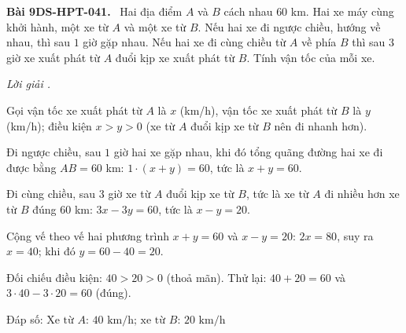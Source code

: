 \documentclass[12pt,a4paper]{article}
\newenvironment{problem}[1][]{\par\medskip\noindent\textbf{Bài #1.}\ }{\par}
\newenvironment{solution}[1][]{\par\noindent\textit{Lời giải #1.}\par}{\par}
\begin{document}
\begin{problem}[9DS-HPT-041]
Hai địa điểm $A$ và $B$ cách nhau $60$ km. Hai xe máy cùng khởi hành, một xe từ $A$ và một xe từ $B$. Nếu hai xe đi ngược chiều, hướng về nhau, thì sau $1$ giờ gặp nhau. Nếu hai xe đi cùng chiều từ $A$ về phía $B$ thì sau $3$ giờ xe xuất phát từ $A$ đuổi kịp xe xuất phát từ $B$. Tính vận tốc của mỗi xe.

\begin{solution}
Gọi vận tốc xe xuất phát từ $A$ là $x$ (km/h), vận tốc xe xuất phát từ $B$ là $y$ (km/h); điều kiện $x > y > 0$ (xe từ $A$ đuổi kịp xe từ $B$ nên đi nhanh hơn).

Đi ngược chiều, sau $1$ giờ hai xe gặp nhau, khi đó tổng quãng đường hai xe đi được bằng $AB = 60$ km: $1 \cdot (x + y) = 60$, tức là $x + y = 60$.

Đi cùng chiều, sau $3$ giờ xe từ $A$ đuổi kịp xe từ $B$, tức là xe từ $A$ đi nhiều hơn xe từ $B$ đúng $60$ km: $3x - 3y = 60$, tức là $x - y = 20$.

Cộng vế theo vế hai phương trình $x + y = 60$ và $x - y = 20$: $2x = 80$, suy ra $x = 40$; khi đó $y = 60 - 40 = 20$.

Đối chiếu điều kiện: $40 > 20 > 0$ (thoả mãn). Thử lại: $40 + 20 = 60$ và $3 \cdot 40 - 3 \cdot 20 = 60$ (đúng).

Đáp số: $\boxed{\text{Xe từ } A \text{: } 40 \text{ km/h; xe từ } B \text{: } 20 \text{ km/h}}$
\end{solution}
\end{problem}
\end{document}
